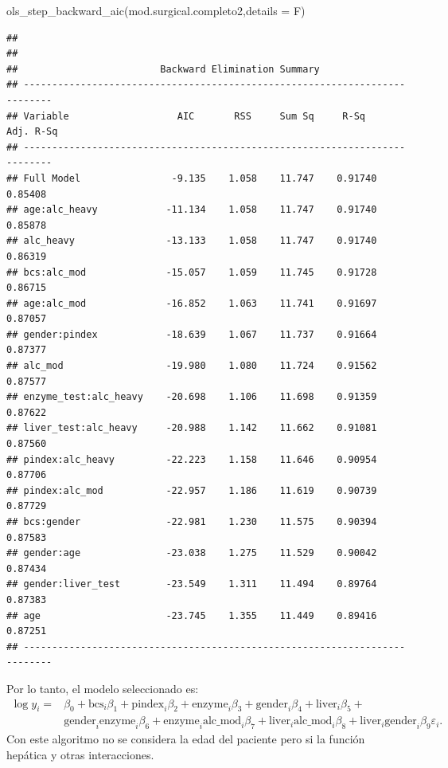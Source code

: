 \documentclass[
]{article}
\newenvironment{Shaded}{\begin{snugshade}}{\end{snugshade}}
\newcommand{\AttributeTok}[1]{\textcolor[rgb]{0.77,0.63,0.00}{#1}}
\newcommand{\FunctionTok}[1]{\textcolor[rgb]{0.00,0.00,0.00}{#1}}
\newcommand{\NormalTok}[1]{#1}
\begin{document}
\begin{Shaded}
\begin{Highlighting}[]
\FunctionTok{ols\_step\_backward\_aic}\NormalTok{(mod.surgical.completo2,}\AttributeTok{details =}\NormalTok{ F)}
\end{Highlighting}
\end{Shaded}

\begin{verbatim}
## 
## 
##                         Backward Elimination Summary                         
## ---------------------------------------------------------------------------
## Variable                   AIC       RSS     Sum Sq     R-Sq      Adj. R-Sq 
## ---------------------------------------------------------------------------
## Full Model                -9.135    1.058    11.747    0.91740      0.85408 
## age:alc_heavy            -11.134    1.058    11.747    0.91740      0.85878 
## alc_heavy                -13.133    1.058    11.747    0.91740      0.86319 
## bcs:alc_mod              -15.057    1.059    11.745    0.91728      0.86715 
## age:alc_mod              -16.852    1.063    11.741    0.91697      0.87057 
## gender:pindex            -18.639    1.067    11.737    0.91664      0.87377 
## alc_mod                  -19.980    1.080    11.724    0.91562      0.87577 
## enzyme_test:alc_heavy    -20.698    1.106    11.698    0.91359      0.87622 
## liver_test:alc_heavy     -20.988    1.142    11.662    0.91081      0.87560 
## pindex:alc_heavy         -22.223    1.158    11.646    0.90954      0.87706 
## pindex:alc_mod           -22.957    1.186    11.619    0.90739      0.87729 
## bcs:gender               -22.981    1.230    11.575    0.90394      0.87583 
## gender:age               -23.038    1.275    11.529    0.90042      0.87434 
## gender:liver_test        -23.549    1.311    11.494    0.89764      0.87383 
## age                      -23.745    1.355    11.449    0.89416      0.87251 
## ---------------------------------------------------------------------------
\end{verbatim}

Por lo tanto, el modelo seleccionado es:
\begin{equation}
\begin{split}
\log y_{i} =& \beta_{0} + \mbox{bcs}_{i}\beta_{1} + \mbox{pindex}_{i}\beta_{2} + \mbox{enzyme}_{i}\beta_{3} + \mbox{gender}_{i}\beta_{4} + \mbox{liver}_{i}\beta_{5} + \\
& \mbox{gender}_{i}\mbox{enzyme}_{i}\beta_{6} + \mbox{enzyme}_{i}\mbox{alc_mod}_{i}\beta_{7} + \mbox{liver}_{i}\mbox{alc_mod}_{i}\beta_{8} + \mbox{liver}_{i}\mbox{gender}_{i}\beta_{9} \varepsilon_{i}.
\end{split}
\nonumber
\end{equation}
Con este algoritmo no se considera la edad del paciente pero si la función hepática y otras interacciones.
\end{document}
